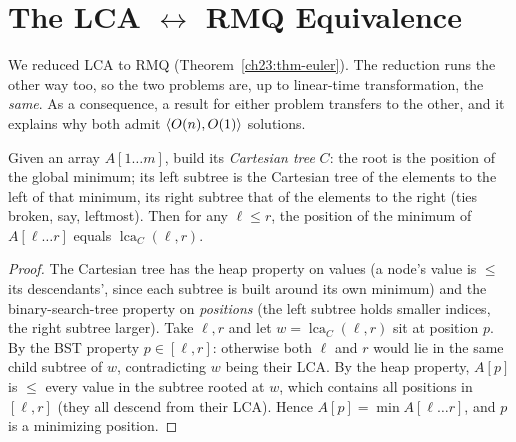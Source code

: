 \section{The LCA \texorpdfstring{$\leftrightarrow$}{<->} RMQ Equivalence}
\label{ch23:equivalence}

We reduced LCA to RMQ (Theorem~\ref{ch23:thm-euler}). The reduction runs the other way too,
so the two problems are, up to linear-time transformation, the
\emph{same}. As a consequence, a result for either problem transfers to the
other, and it explains why both admit $\langle O(n),O(1)\rangle$ solutions.

\begin{theorem}
\label{ch23:thm-cartesian}
Given an array $A[1\ldots m]$, build its \emph{Cartesian tree} $C$: the root is the position
of the global minimum; its left subtree is the Cartesian tree of the elements to the left of
that minimum, its right subtree that of the elements to the right (ties broken, say,
leftmost). Then for any $\ell\le r$, the position of the minimum of $A[\ell\ldots r]$ equals
$\operatorname{lca}_C(\ell,r)$.
\end{theorem}

\begin{proof}
The Cartesian tree has the heap property on values (a node's value is $\le$ its descendants',
since each subtree is built around its own minimum) and the binary-search-tree property on
\emph{positions} (the left subtree holds smaller indices, the right subtree larger). Take
$\ell,r$ and let $w=\operatorname{lca}_C(\ell,r)$ sit at position $p$. By the BST property
$p\in[\ell,r]$: otherwise both $\ell$ and $r$ would lie in the same child subtree of $w$,
contradicting $w$ being their LCA. By the heap property, $A[p]$ is $\le$ every value in the
subtree rooted at $w$, which contains all positions in $[\ell,r]$ (they all descend from
their LCA). Hence $A[p]=\min A[\ell\ldots r]$, and $p$ is a minimizing position.
\end{proof}

